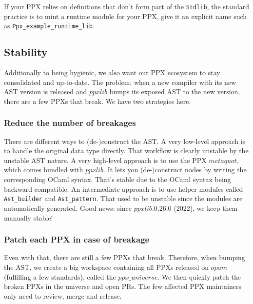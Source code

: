 \documentclass[10pt, a4paper, twocolumn]{article}
\newcounter{example}[section]\setcounter{example}{0}
\begin{document}
If your PPX relies on definitions that don't form part of the \texttt{Stdlib},
the standard practice is to mint a runtime module for your PPX, give it an
explicit name such as \texttt{Ppx\_example\_runtime\_lib}.

\subsection{Stability}\label{stability}

Additionally to being hygienic, we also want our PPX ecosystem to stay
consolidated and up-to-date. The problem: when a new compiler with its new AST
version is released and $ppxlib$ bumps its exposed AST to the new version, there
are a few PPXs that break. We have two strategies here.

\subsubsection*{Reduce the number of breakages}

There are different ways to (de-)construct the AST. A very low-level approach is
to handle the original data type directly. That workflow is clearly unstable by
the unstable AST nature. A very high-level approach is to use the PPX
$metaquot$, which comes bundled with $ppxlib$. It lets you (de-)construct nodes
by writing the corresponding OCaml syntax. That's stable due to the OCaml syntax
being backward compatible. An intermediate approach is to use helper modules
called \texttt{Ast\_builder} and \texttt{Ast\_pattern}. That used to be unstable
since the modules are automatically generated. Good news: since $ppxlib.0.26.0$
(2022), we keep them manually stable!

\subsubsection*{Patch each PPX in case of breakage}

Even with that, there are still a few PPXs that break. Therefore, when bumping
the AST, we create a big workspace containing all PPXs released on $opam$
(fulfilling a few standards), called the $ppx\_universe$. We then
quickly patch the broken PPXs in the universe and open PRs. The few affected PPX
maintainers only need to review, merge and release.
\end{document}
